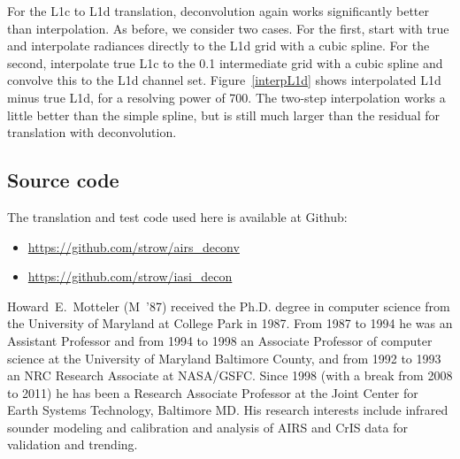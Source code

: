 \documentclass[journal]{IEEEtran}
\begin{document}
For the {\airs} L1c to L1d translation, deconvolution again works
significantly better than interpolation.  As before, we consider two
cases.  For the first, start with true {\airs} and interpolate
radiances directly to the L1d grid with a cubic spline.  For the
second, interpolate true L1c to the 0.1 {\wn} intermediate grid with
a cubic spline and convolve this to the L1d channel set.
Figure~\ref{interpL1d} shows interpolated L1d minus true L1d, for a
resolving power of 700.  The two-step interpolation works a little
better than the simple spline, but is still much larger than the
residual for translation with deconvolution.

\subsection{Source code}

The translation and test code used here is available at Github:

\begin{itemize}
   \item \url{https://github.com/strow/airs_deconv}
   \item \url{https://github.com/strow/iasi_decon}
\end{itemize}

% 
% 




\vspace{10cm}\vfill

\begin{IEEEbiography}{Howard~E.~Motteler}
  (M~'87) received the Ph.D. degree in computer science from the
  University of Maryland at College Park in 1987.  From 1987 to 1994
  he was an Assistant Professor and from 1994 to 1998 an Associate
  Professor of computer science at the University of Maryland
  Baltimore County, and from 1992 to 1993 an NRC Research Associate
  at NASA/GSFC.  Since 1998 (with a break from 2008 to 2011) he has
  been a Research Associate Professor at the Joint Center for Earth
  Systems Technology, Baltimore MD.  His research interests include
  infrared sounder modeling and calibration and analysis of AIRS and
  CrIS data for validation and trending.

\end{IEEEbiography}
\end{document}
